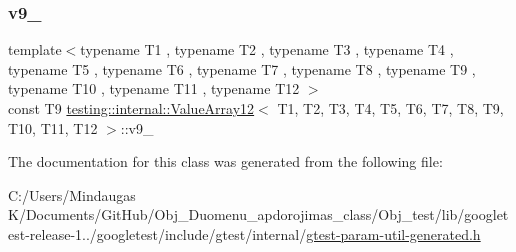 \mbox{\label{classtesting_1_1internal_1_1_value_array12_a3f16d4ba85a21ade88185f7444d69c08}} 
\subsubsection{\texorpdfstring{v9\_}{v9\_}}
{\footnotesize\ttfamily template$<$typename T1 , typename T2 , typename T3 , typename T4 , typename T5 , typename T6 , typename T7 , typename T8 , typename T9 , typename T10 , typename T11 , typename T12 $>$ \\
const T9 \mbox{\hyperlink{classtesting_1_1internal_1_1_value_array12}{testing\+::internal\+::\+Value\+Array12}}$<$ T1, T2, T3, T4, T5, T6, T7, T8, T9, T10, T11, T12 $>$\+::v9\+\_\+\hspace{0.3cm}{\ttfamily [private]}}



The documentation for this class was generated from the following file\+:\begin{DoxyCompactItemize}
\item 
C\+:/\+Users/\+Mindaugas K/\+Documents/\+Git\+Hub/\+Obj\+\_\+\+Duomenu\+\_\+apdorojimas\+\_\+class/\+Obj\+\_\+test/lib/googletest-\/release-\/1../googletest/include/gtest/internal/\mbox{\hyperlink{gtest-param-util-generated_8h}{gtest-\/param-\/util-\/generated.\+h}}\end{DoxyCompactItemize}
